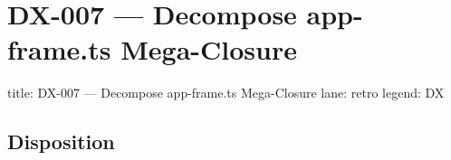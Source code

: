 \chapter{DX-007 --- Decompose app-frame.ts Mega-Closure}\label{record-307}

\smallskip

\begin{RecordMeta}
title: DX-007 — Decompose app-frame.ts Mega-Closure
lane: retro
legend: DX

\end{RecordMeta}

\section{Disposition}\label{record-307-disposition}

